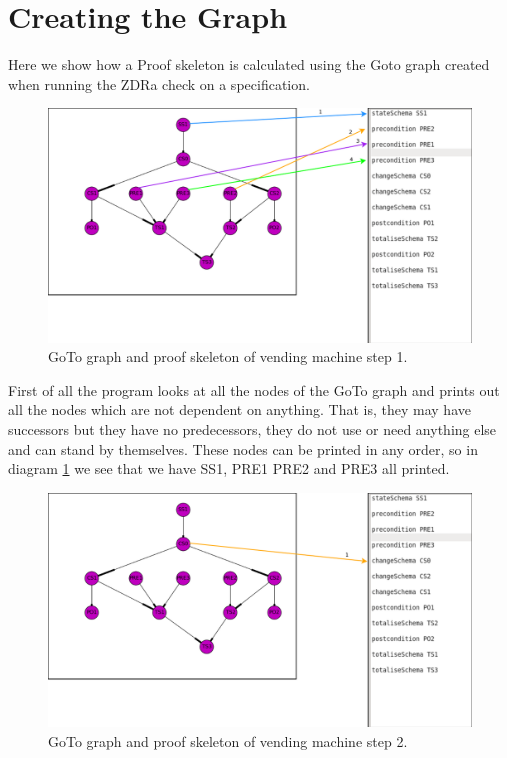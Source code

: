\section{Creating the Graph}

Here we show how a Proof skeleton is calculated using the Goto graph created when running the ZDRa check on a specification.

\begin{figure}[H]
\includegraphics[scale=0.3]{Figures/skeleton/1.png}
\caption{GoTo graph and proof skeleton of vending machine step 1.}
\label{fig:1}
\end{figure}

First of all the program looks at all the nodes of the GoTo graph and prints out all the nodes which are not dependent on anything. That is, they may have successors but they have no predecessors, they do not use or need anything else and can stand by themselves. These nodes can be printed in any order, so in diagram \ref{fig:1} we see that we have SS1, PRE1 PRE2 and PRE3 all printed.

\begin{figure}[H]
\includegraphics[scale=0.3]{Figures/skeleton/2.png}
\caption{GoTo graph and proof skeleton of vending machine step 2.}
\label{fig:2}
\end{figure}

